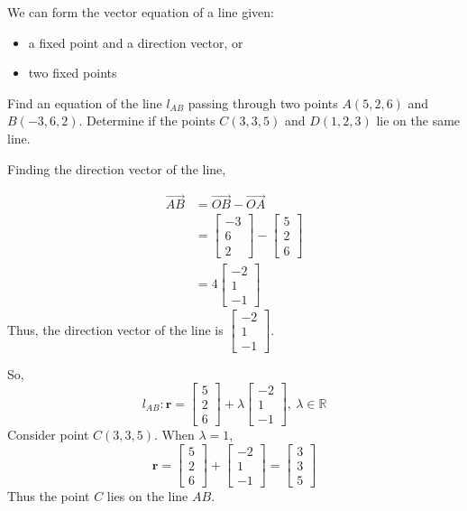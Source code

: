 \documentclass[11pt,a4paper]{book}
\newcommand{\R}{\mathbb{R}}
\begin{document}
\newpage

We can form the vector equation of a line given:
\begin{itemize}
\item a fixed point and a direction vector, or
\item two fixed points
\end{itemize}

\begin{example}

Find an equation of the line $l_{AB}$ passing through two points
$A\left(5,2,6\right)$ and $B\left(-3,6,2\right)$. Determine if the
points $C\left(3,3,5\right)$ and $D\left(1,2,3\right)$ lie on the
same line.

\Solution

Finding the direction vector of the line,

\renewcommand\arraystretch{.7}

\begin{align*}
\overrightarrow{AB} & =\overrightarrow{OB}-\overrightarrow{OA}\\
 & =\begin{bmatrix}-3\\
6\\
2
\end{bmatrix}-\begin{bmatrix}5\\
2\\
6
\end{bmatrix}\\
 & =4\begin{bmatrix}-2\\
1\\
-1
\end{bmatrix}
\end{align*}
Thus, the direction vector of the line is $\begin{bmatrix}-2\\
1\\
-1
\end{bmatrix}$.

So,
\[
l_{AB}:\textbf{r}=\begin{bmatrix}5\\
2\\
6
\end{bmatrix}+\lambda\begin{bmatrix}-2\\
1\\
-1
\end{bmatrix},\:\lambda\in\R
\]
Consider point $C\left(3,3,5\right)$. When $\lambda=1$,
\[
\textbf{r}=\begin{bmatrix}5\\
2\\
6
\end{bmatrix}+\begin{bmatrix}-2\\
1\\
-1
\end{bmatrix}=\begin{bmatrix}3\\
3\\
5
\end{bmatrix}
\]
Thus the point $C$ lies on the line $AB$.


\end{example}
\end{document}
